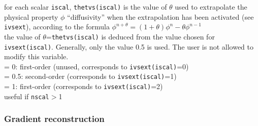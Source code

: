 {for each scalar {\tt iscal}, {\tt thetvs(iscal)} is the value of $\theta$ used to
extrapolate the physical property $\phi$ ``diffusivity'' when the extrapolation has
been activated (see {\tt ivsext}), according to the
formula $\phi^{n+\theta}=(1+\theta)\phi^n-\theta \phi^{n-1}$\\
the value of $\theta$={\tt thetvs(iscal)} is deduced from the value chosen for
{\tt ivsext(iscal)}. Generally, only the value 0.5 is used. The user is not
allowed to modify this variable.\\
\hspace*{1.3cm}= 0: first-order (unused, corresponds to
{\tt ivsext(iscal)}=0)\\
\hspace*{1.3cm}= 0.5: second-order (corresponds to {\tt ivsext(iscal)}=1) \\
\hspace*{1.3cm}= 1: first-order (corresponds to {\tt ivsext(iscal)}=2) \\
useful if {\tt nscal}$>$1}


\subsubsection{Gradient reconstruction}

